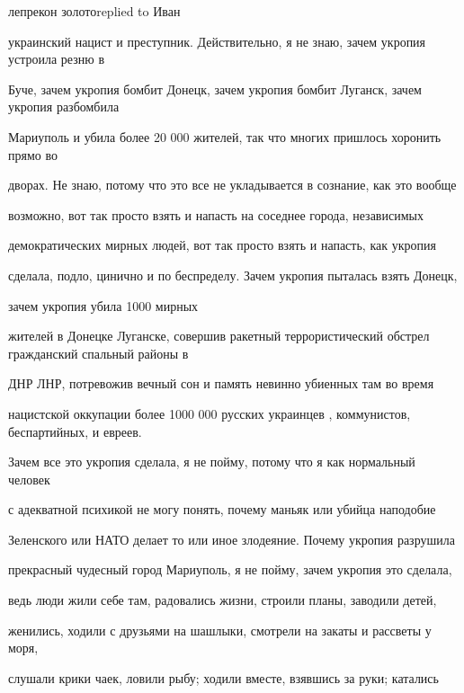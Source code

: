  
 
 
 
 

лепрекон золотоreplied to Иван

украинский нацист и преступник. Действительно, я не знаю, зачем укропия устроила резню в

Буче, зачем укропия бомбит Донецк, зачем укропия бомбит Луганск, зачем укропия разбомбила

Мариуполь и убила более 20 000 жителей, так что многих пришлось хоронить прямо во

дворах. Не знаю, потому что это все не укладывается в сознание, как это вообще

возможно, вот так просто взять и напасть на соседнее города, независимых

демократических мирных людей, вот так просто взять и напасть, как укропия

сделала, подло, цинично и по беспределу. Зачем укропия пыталась взять Донецк,

зачем укропия убила 1000 мирных

жителей в Донецке Луганске, совершив ракетный террористический обстрел гражданский спальный районы в

ДНР ЛНР, потревожив вечный сон и память невинно убиенных там во время

нацистской оккупации более 1000 000 русских украинцев , коммунистов, беспартийных, и евреев.

Зачем все это укропия сделала, я не пойму, потому что я как нормальный человек

с адекватной психикой не могу понять, почему маньяк или убийца наподобие

Зеленского или НАТО делает то или иное злодеяние. Почему укропия разрушила

прекрасный чудесный город Мариуполь, я не пойму, зачем укропия это сделала,

ведь люди жили себе там, радовались жизни, строили планы, заводили детей,

женились, ходили с друзьями на шашлыки, смотрели на закаты и рассветы у моря,

слушали крики чаек, ловили рыбу; ходили вместе, взявшись за руки; катались

